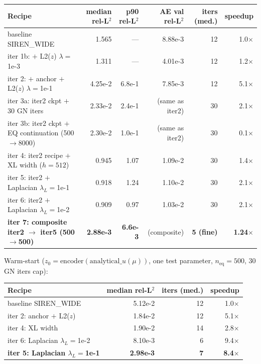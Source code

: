 \begin{center}
\begin{tabular}{l r r r r r}
  \textbf{Recipe} & \textbf{median rel-L$^2$} & \textbf{p90 rel-L$^2$} & \textbf{AE val rel-L$^2$} & \textbf{iters (med.)} & \textbf{speedup} \\
  \hline
  baseline SIREN\_WIDE                                & 1.565   & ---     & 8.88e-3 & 12 & 1.0$\times$ \\
  iter 1b: $+$ L2($z$) $\lambda{=}$1e-3               & 1.311   & ---     & 4.01e-3 & 12 & 1.2$\times$ \\
  iter 2: $+$ anchor $+$ L2($z$) $\lambda{=}$1e-1     & 4.25e-2 & 6.8e-1  & 7.85e-3 & 12 & 5.1$\times$ \\
  iter 3a: iter2 ckpt $+$ 30 GN iters                 & 2.33e-2 & 2.4e-1  & (same as iter2) & 30 & 2.1$\times$ \\
  iter 3b: iter2 ckpt $+$ EQ continuation (500$\to$8000) & 2.30e-2 & 1.0e-1 & (same as iter2) & 30 & 0.1$\times$ \\
  iter 4: iter2 recipe $+$ XL width ($h{=}512$)       & 0.945   & 1.07    & 1.09e-2 & 30 & 1.4$\times$ \\
  iter 5: iter2 $+$ Laplacian $\lambda_L{=}$1e-1      & 0.918   & 1.24    & 1.10e-2 & 30 & 2.1$\times$ \\
  iter 6: iter2 $+$ Laplacian $\lambda_L{=}$1e-2      & 0.909   & 0.97    & 1.03e-2 & 30 & 2.1$\times$ \\
  \textbf{iter 7: composite iter2 $\to$ iter5 (500$\to$500)} & \textbf{2.88e-3} & \textbf{6.6e-3} & (composite) & \textbf{5 (fine)} & \textbf{1.24$\times$} \\
\end{tabular}
\end{center}

Warm-start ($z_0 = \text{encoder}(\text{analytical}\_u(\mu))$, one test
parameter, $n_{\text{eq}}{=}500$, 30 GN iters cap):

\begin{center}
\begin{tabular}{l r r r}
  \textbf{Recipe} & \textbf{median rel-L$^2$} & \textbf{iters (med.)} & \textbf{speedup} \\
  \hline
  baseline SIREN\_WIDE                            & 5.12e-2 & 12 & 1.0$\times$ \\
  iter 2: anchor $+$ L2($z$)                      & 1.84e-2 & 12 & 5.1$\times$ \\
  iter 4: XL width                                & 1.90e-2 & 14 & 2.8$\times$ \\
  iter 6: Laplacian $\lambda_L{=}$1e-2            & 8.10e-3 & 6  & 9.4$\times$ \\
  \textbf{iter 5: Laplacian $\lambda_L{=}$1e-1}   & \textbf{2.98e-3} & \textbf{7} & \textbf{8.4$\times$} \\
\end{tabular}
\end{center}

